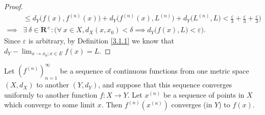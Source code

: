 \begin{proof}
\begin{align*}
                 & \leq d_Y\big(f(x), f^{(n)}(x)\big) + d_Y\big(f^{(n)}(x), L^{(n)}\big) + d_Y\big(L^{(n)}, L\big) < \frac{\varepsilon}{3} + \frac{\varepsilon}{3} + \frac{\varepsilon}{3}\Big) \\
        \implies & \exists\ \delta \in \mathbf{R}^+ : \Big(\forall\ x \in X, d_X(x, x_0) < \delta \implies d_Y\big(f(x), L\big) < \varepsilon\Big).
    \end{align*}
    Since \(\varepsilon\) is arbitrary, by Definition \ref{3.1.1} we know that \(d_Y - \lim_{x \to x_0 ; x \in E} f(x) = L\).
\end{proof}

\begin{proposition}\label{3.3.4}
    Let \((f^{(n)})_{n = 1}^\infty\) be a sequence of continuous functions from one metric space \((X, d_X)\) to another \((Y, d_Y)\), and suppose that this sequence converges uniformly to another function \(f : X \to Y\).
    Let \(x^{(n)}\) be a sequence of points in \(X\) which converge to some limit \(x\).
    Then \(f^{(n)}(x^{(n)})\) converges (in \(Y\)) to \(f(x)\).
\end{proposition}

